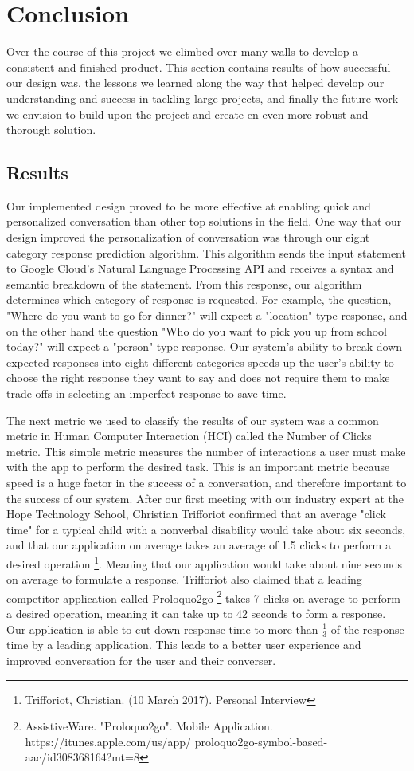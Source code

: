 \chapter{Conclusion}

Over the course of this project we climbed over many walls to develop a consistent and finished product. This section contains results of how successful our design was, the lessons we learned along the way that helped develop our understanding and success in tackling large projects, and finally the future work we envision to build upon the project and create en even more robust and thorough solution.

\section{Results}
Our implemented design proved to be more effective at enabling quick and personalized conversation than other top solutions in the field. One way that our design improved the personalization of conversation was through our eight category response prediction algorithm. This algorithm sends the input statement to Google Cloud's Natural Language Processing API and receives a syntax and semantic breakdown of the statement. From this response, our algorithm determines which category of response is requested. For example, the question, "Where do you want to go for dinner?" will expect a "location" type response, and on the other hand the question "Who do you want to pick you up from school today?" will expect a "person" type response. Our system's ability to break down expected responses into eight different categories speeds up the user's ability to choose the right response they want to say and does not require them to make trade-offs in selecting an imperfect response to save time.

The next metric we used to classify the results of our system was a common metric in Human Computer Interaction (HCI) called the Number of Clicks metric. This simple metric measures the number of interactions a user must make with the app to perform the desired task. This is an important metric because speed is a huge factor in the success of a conversation, and therefore important to the success of our system. After our first meeting with our industry expert at the Hope Technology School, Christian Trifforiot confirmed that an average "click time" for a typical child with a nonverbal disability would take about six seconds, and that our application on average takes an average of 1.5 clicks to perform a desired operation \footnote{Trifforiot, Christian. (10 March 2017). Personal Interview}. Meaning that our application would take about nine seconds on average to formulate a response. Trifforiot also claimed that a leading competitor application called Proloquo2go \footnote{AssistiveWare. "Proloquo2go". Mobile Application. https://itunes.apple.com/us/app/ proloquo2go-symbol-based-aac/id308368164?mt=8} takes 7 clicks on average to perform a desired operation, meaning it can take up to 42 seconds to form a response. Our application is able to cut down response time to more than \(\frac{1}{3}\) of the response time by a leading application. This leads to a better user experience and improved conversation for the user and their converser.

